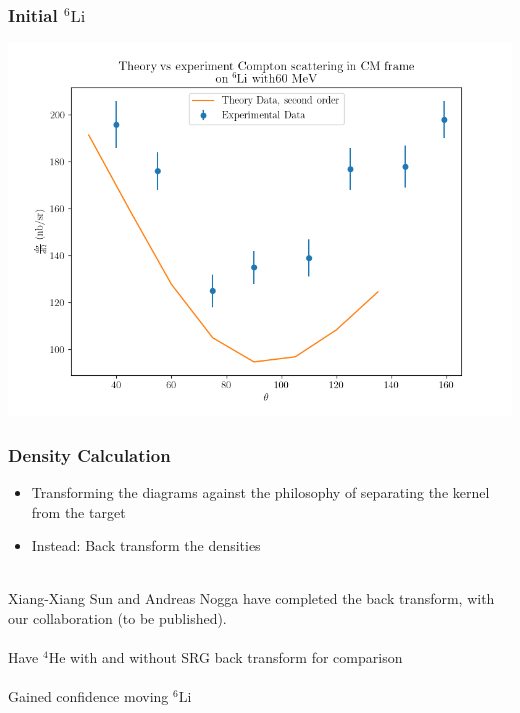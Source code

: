 \documentclass{beamer}
\newcommand{\LiS}{{}^{6} \mathrm{Li} }
\newcommand{\HeF}{{}^{4} \mathrm{He}}
\begin{document}
\begin{frame}\frametitle{Initial $\LiS$ }
\begin{center}
\includegraphics[scale=0.5]{Li6Result1.png}
\end{center}
\end{frame}






\begin{frame}\frametitle{Density Calculation}
\begin{itemize}
    \item Transforming the diagrams against the philosophy of separating the kernel from the target
    \item Instead: Back transform the densities 
\end{itemize}
~\\Xiang-Xiang Sun and Andreas Nogga have completed the back transform, with our collaboration (to be published).\\~\\
Have $\HeF$ with and without SRG back transform for comparison \\~\\
Gained confidence moving $\LiS$

\end{frame}
\end{document}
